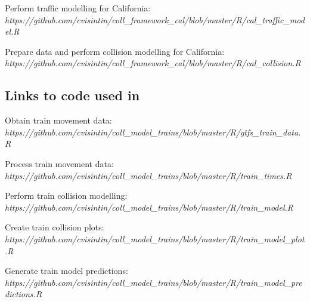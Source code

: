 \vspace{.3cm}
\noindent Perform traffic modelling for California:\\
\textit{https://github.com/cvisintin/coll\_framework\_cal/blob/master/R/cal\_traffic\_model.R}
%

\vspace{.3cm}
\noindent Prepare data and perform collision modelling for California:\\
\textit{https://github.com/cvisintin/coll\_framework\_cal/blob/master/R/cal\_collision.R}
%


\subsection{Links to code used in }

\noindent Obtain train movement data:\\
\textit{https://github.com/cvisintin/coll\_model\_trains/blob/master/R/gtfs\_train\_data.R}
%

\vspace{.3cm}
\noindent Process train movement data:\\
\textit{https://github.com/cvisintin/coll\_model\_trains/blob/master/R/train\_times.R}
%

\vspace{.3cm}
\noindent Perform train collision modelling:\\
\textit{https://github.com/cvisintin/coll\_model\_trains/blob/master/R/train\_model.R}
%

\vspace{.3cm}
\noindent Create train collision plots:\\
\textit{https://github.com/cvisintin/coll\_model\_trains/blob/master/R/train\_model\_plot.R}
%

\vspace{.3cm}
\noindent Generate train model predictions:\\
\textit{https://github.com/cvisintin/coll\_model\_trains/blob/master/R/train\_model\_predictions.R}
%


